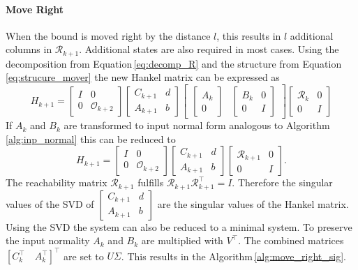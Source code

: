 \documentclass[doctype=mastersthesis,BCOR=15mm,biblatex]{ldvbook}%
\newcommand{\R}{\mathcal{R}} %
\newcommand{\Ob}{\mathcal{O}} %
\newcommand{\eye}{I} %
\begin{document}
\paragraph{Move Right}
When the bound is moved right by the distance $l$, this results in $l$ additional columns in $\R_{k+1}$.
Additional states are also required in most cases.
Using the decomposition from Equation\,\ref{eq:decomp_R} and the structure from Equation\,\ref{eq:strucure_mover} the new Hankel matrix can be expressed as
\begin{equation}
	H_{k+1} = 
	\begin{bmatrix}
	\eye & 0\\ 0 &\Ob_{k+2}
	\end{bmatrix}
	\begin{bmatrix}
	C_{k+1} & d\\
	A_{k+1} & b
	\end{bmatrix}
	\begin{bmatrix}
	\begin{bmatrix}
	A_{k} \\
	0
	\end{bmatrix}&
	\begin{bmatrix}
		B_{k}&0\\
		0&\eye
	\end{bmatrix}
	\end{bmatrix}
	\begin{bmatrix}
	\R_{k} & 0\\ 0& \eye
	\end{bmatrix}
\end{equation}
If $A_{k}$ and $B_{k}$ are transformed to input normal form analogous to Algorithm\,\ref{alg:inp_normal} this can be reduced to 
\begin{equation}
H_{k+1} = 
\begin{bmatrix}
\eye & 0\\ 0 &\Ob_{k+2}
\end{bmatrix}
\begin{bmatrix}
C_{k+1} & d\\
A_{k+1} & b
\end{bmatrix}
\begin{bmatrix}
\R_{k+1} & 0\\ 0& \eye
\end{bmatrix}
.
\end{equation}
The reachability matrix $\R_{k+1}$ fulfills $\R_{k+1} \R_{k+1}^\top = \eye$.
Therefore the singular values of the SVD of $\begin{bmatrix}
	C_{k+1} & d\\
	A_{k+1} & b
\end{bmatrix}$ are the singular values of the Hankel matrix.
Using the SVD the system can also be reduced to a minimal system. 
To preserve the input normality $A_{k}$ and $B_{k}$ are multiplied with $V^\top$. The combined matrices $[C_k^\top \quad A_k^\top]^\top$ are set to $U \Sigma$.
This results in the Algorithm\,\ref{alg:move_right_sig}.
\end{document}

